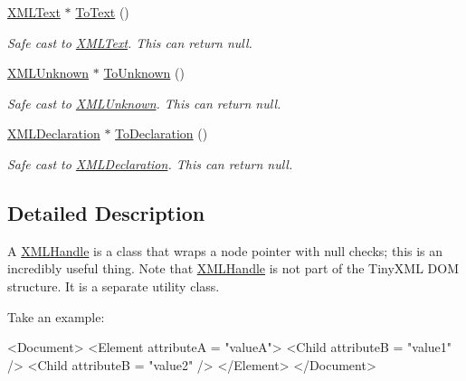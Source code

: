 \begin{DoxyCompactItemize}
\mbox{\label{classtinyxml2_1_1XMLHandle_a6ab9e8cbfb41417246e5657e3842c62a}} 
\hyperlink{classtinyxml2_1_1XMLText}{X\+M\+L\+Text} $\ast$ \hyperlink{classtinyxml2_1_1XMLHandle_a6ab9e8cbfb41417246e5657e3842c62a}{To\+Text} ()
\begin{DoxyCompactList}\small\item\em Safe cast to \hyperlink{classtinyxml2_1_1XMLText}{X\+M\+L\+Text}. This can return null. \end{DoxyCompactList}\item 
\mbox{\label{classtinyxml2_1_1XMLHandle_aa387368a1ad8d843a9f12df863d298de}} 
\hyperlink{classtinyxml2_1_1XMLUnknown}{X\+M\+L\+Unknown} $\ast$ \hyperlink{classtinyxml2_1_1XMLHandle_aa387368a1ad8d843a9f12df863d298de}{To\+Unknown} ()
\begin{DoxyCompactList}\small\item\em Safe cast to \hyperlink{classtinyxml2_1_1XMLUnknown}{X\+M\+L\+Unknown}. This can return null. \end{DoxyCompactList}\item 
\mbox{\label{classtinyxml2_1_1XMLHandle_a108858be7ee3eb53f73b5194c1aa8ff0}} 
\hyperlink{classtinyxml2_1_1XMLDeclaration}{X\+M\+L\+Declaration} $\ast$ \hyperlink{classtinyxml2_1_1XMLHandle_a108858be7ee3eb53f73b5194c1aa8ff0}{To\+Declaration} ()
\begin{DoxyCompactList}\small\item\em Safe cast to \hyperlink{classtinyxml2_1_1XMLDeclaration}{X\+M\+L\+Declaration}. This can return null. \end{DoxyCompactList}\end{DoxyCompactItemize}


\subsection{Detailed Description}
A \hyperlink{classtinyxml2_1_1XMLHandle}{X\+M\+L\+Handle} is a class that wraps a node pointer with null checks; this is an incredibly useful thing. Note that \hyperlink{classtinyxml2_1_1XMLHandle}{X\+M\+L\+Handle} is not part of the Tiny\+X\+ML D\+OM structure. It is a separate utility class.

Take an example\+: \begin{DoxyVerb}<Document>
    <Element attributeA = "valueA">
        <Child attributeB = "value1" />
        <Child attributeB = "value2" />
    </Element>
</Document>
\end{DoxyVerb}


